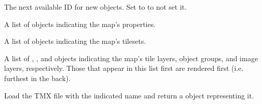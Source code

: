 \documentclass[letterpaper,10pt,english]{sphinxmanual}
\begin{document}
\begin{fulllineitems}

\begin{fulllineitems}
\label{index:tmx.TileMap.nextobjectid}
The next available ID for new objects.  Set to  to
not set it.

\end{fulllineitems}


\begin{fulllineitems}
\label{index:tmx.TileMap.properties}
A list of {\hyperref[index:tmx.Property]{\emph{}}} objects indicating the map's
properties.

\end{fulllineitems}


\begin{fulllineitems}
\label{index:tmx.TileMap.tilesets}
A list of {\hyperref[index:tmx.Tileset]{\emph{}}} objects indicating the map's tilesets.

\end{fulllineitems}


\begin{fulllineitems}
\label{index:tmx.TileMap.layers}
A list of {\hyperref[index:tmx.Layer]{\emph{}}}, {\hyperref[index:tmx.ObjectGroup]{\emph{}}}, and
{\hyperref[index:tmx.ImageLayer]{\emph{}}} objects indicating the map's tile layers,
object groups, and image layers, respectively.  Those that appear
in this list first are rendered first (i.e. furthest in the
back).

\end{fulllineitems}


\end{fulllineitems}


\begin{fulllineitems}
\label{index:tmx.TileMap.load}
Load the TMX file with the indicated name and return a
{\hyperref[index:tmx.TileMap]{\emph{}}} object representing it.

\end{fulllineitems}
\end{document}
